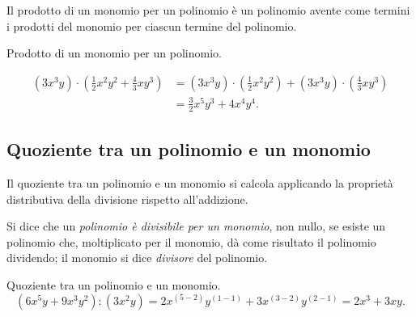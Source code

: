 \osservazione Il prodotto di un monomio per un polinomio è
un polinomio avente come termini i prodotti del monomio per ciascun
termine del polinomio.

\begin{exrig}
 \begin{esempio}
 Prodotto di un monomio per un polinomio.

 \begin{equation*}
\begin{split}
 \left(3x^{3}y\right)\cdot\left(\frac{1}{2}x^{2}y^{2}+\frac{4}{3}{xy}^{3}\right)&=\left(3x^{3}y\right)\cdot\left(\frac{1}{2}x^{2}y^{2}\right)+\left(3x^{3}y\right)\cdot%
\left(\frac{4}{3}{xy}^{3}\right)\\
&=\frac{3}{2}x^{5}y^{3}+4x^{4}y^{4}.
\end{split}
\end{equation*}
 \end{esempio}
\end{exrig}


\subsection{Quoziente tra un polinomio e un monomio}
\label{subsec:10_poli_quozientepermonomio}

Il quoziente tra un polinomio e un monomio si calcola applicando la
proprietà distributiva della divisione rispetto
all'addizione.

\begin{definizione}
 Si dice che un \emph{polinomio è divisibile per un monomio}, non
nullo, se esiste un polinomio che, moltiplicato per il monomio, dà
come risultato il polinomio dividendo; il monomio si dice
\emph{divisore} del polinomio.
\end{definizione}

\begin{exrig}
 \begin{esempio}
 Quoziente tra un polinomio e un monomio.
 \[\left(6x^{5}y+9x^{3}y^{2}\right):\left(3x^{2}y\right)=2x^{(5-2)}y^{(1-1)}+3x^{(3-2)}y^{(2-1)}=2x^{3}+3{xy}.\]
 \end{esempio}
\end{exrig}
\osservazione

